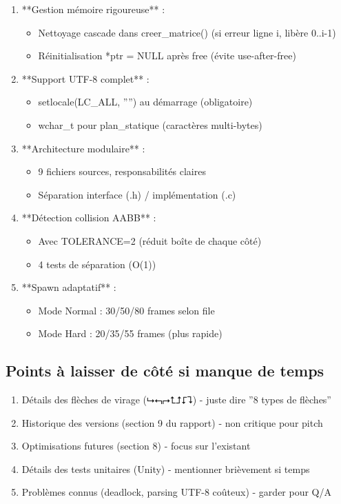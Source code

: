 \documentclass[12pt,a4paper]{article}
\begin{document}
\begin{enumerate}
    \item **Gestion mémoire rigoureuse** :
    \begin{itemize}
        \item Nettoyage cascade dans creer\_matrice() (si erreur ligne i, libère 0..i-1)
        \item Réinitialisation *ptr = NULL après free (évite use-after-free)
    \end{itemize}
    \item **Support UTF-8 complet** :
    \begin{itemize}
        \item setlocale(LC\_ALL, '''') au démarrage (obligatoire)
        \item wchar\_t pour plan\_statique (caractères multi-bytes)
    \end{itemize}
    \item **Architecture modulaire** :
    \begin{itemize}
        \item 9 fichiers sources, responsabilités claires
        \item Séparation interface (.h) / implémentation (.c)
    \end{itemize}
    \item **Détection collision AABB** :
    \begin{itemize}
        \item Avec TOLERANCE=2 (réduit boîte de chaque côté)
        \item 4 tests de séparation (O(1))
    \end{itemize}
    \item **Spawn adaptatif** :
    \begin{itemize}
        \item Mode Normal : 30/50/80 frames selon file
        \item Mode Hard : 20/35/55 frames (plus rapide)
    \end{itemize}
\end{enumerate}

\subsection{Points à laisser de côté si manque de temps}

\begin{enumerate}
    \item Détails des flèches de virage (⮡⮢⮣⮤⮥⮦⮧) - juste dire ''8 types de flèches''
    \item Historique des versions (section 9 du rapport) - non critique pour pitch
    \item Optimisations futures (section 8) - focus sur l'existant
    \item Détails des tests unitaires (Unity) - mentionner brièvement si temps
    \item Problèmes connus (deadlock, parsing UTF-8 coûteux) - garder pour Q/A
\end{enumerate}
\end{document}
